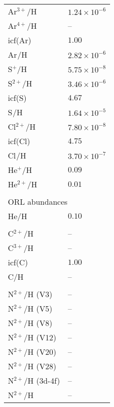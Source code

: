 \begin{longtable}[l]{ll}
 Ar$^{3+}$/H                         & $  1.24\times 10^{ -6}$\\
 Ar$^{4+}$/H                         & -- \\
 icf(Ar)                             & $  1.00$\\
 Ar$^{}$/H                           & $  2.82\times 10^{ -6}$\\
 S$^{+}$/H                           & $  5.75\times 10^{ -8}$\\
 S$^{2+}$/H                          & $  3.46\times 10^{ -6}$\\
 icf(S)                              & $  4.67$\\
 S$^{}$/H                            & $  1.64\times 10^{ -5}$\\
 Cl$^{2+}$/H                         & $  7.80\times 10^{ -8}$\\
 icf(Cl)                             & $  4.75$\\
 Cl$^{}$/H                           & $  3.70\times 10^{ -7}$\\
 He$^{+}$/H                          & $  0.09$\\
 He$^{2+}$/H                         & $  0.01$\\
 \vspace{0.2cm}\\\multicolumn{2}{l}{ORL abundances}\\ \hline
 He/H                                & $  0.10$\\
 \\
 C$^{2+}$/H                          & -- \\
 C$^{3+}$/H                          & -- \\
 icf(C)                              & $  1.00$\\
 C/H                                 & -- \\
 \\
 N$^{2+}$/H (V3)                     & -- \\
 N$^{2+}$/H (V5)                     & -- \\
 N$^{2+}$/H (V8)                     & -- \\
 N$^{2+}$/H (V12)                    & -- \\
 N$^{2+}$/H (V20)                    & -- \\
 N$^{2+}$/H (V28)                    & -- \\
 N$^{2+}$/H (3d-4f)                  & -- \\
 N$^{2+}$/H                          & -- \\

\end{longtable}
